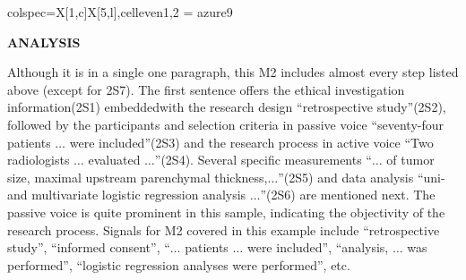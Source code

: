 \documentclass{ctexbook}
\begin{document}
\begin{sample}[label={myautocounter}]{\heiti}
{\begin{tblr}{colspec={X[1,c]X[5,l]},cell{even}{1,2} = {azure9}}
    \bottomrule
  \end{tblr}
  }

  \noindent \textbf{ANALYSIS}

  Although it is in a single one paragraph, this M2 includes almost every step listed above (except for 2S7). The first sentence offers the ethical investigation information(2S1) embeddedwith the research design ``retrospective study''(2S2), followed by the participants and selection criteria in passive voice ``seventy-four patients $\dots$ were included''(2S3) and the research process in active voice ``Two radiologists $\dots$ evaluated $\dots$''(2S4). Several specific measurements ``$\dots$ of tumor size, maximal upstream parenchymal thickness,$\dots$''(2S5) and data analysis ``uni-and multivariate logistic regression analysis $\dots$''(2S6) are mentioned next. The passive voice is quite prominent in this sample, indicating the objectivity of the research process. Signals for M2 covered in this example include ``retrospective study'', ``informed consent'', ``$\dots$ patients $\dots$ were included'', ``analysis, $\dots$ was performed'', ``logistic regression analyses were performed'', etc.

\end{sample}
\end{document}
